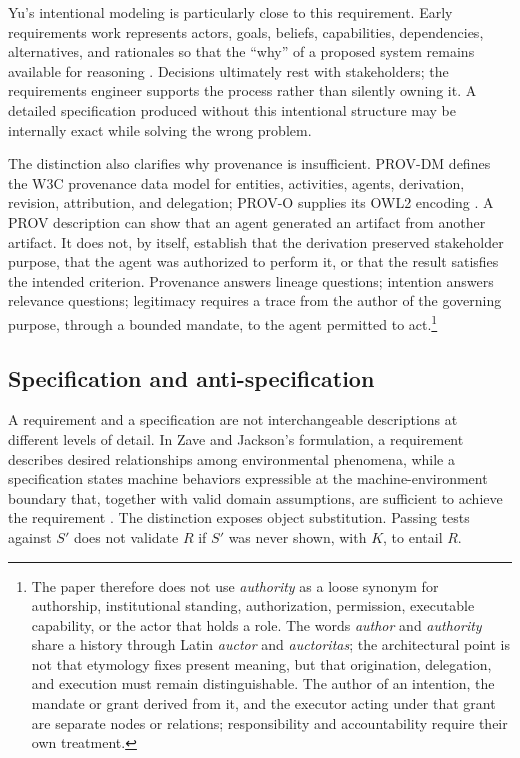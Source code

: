 \documentclass[10pt,a4paper]{article}
\begin{document}
Yu's intentional modeling is particularly close to this requirement. Early requirements work represents actors, goals, beliefs, capabilities, dependencies, alternatives, and rationales so that the ``why'' of a proposed system remains available for reasoning \cite{yu1997}. Decisions ultimately rest with stakeholders; the requirements engineer supports the process rather than silently owning it. A detailed specification produced without this intentional structure may be internally exact while solving the wrong problem.

The distinction also clarifies why provenance is insufficient. PROV-DM defines the W3C provenance data model for entities, activities, agents, derivation, revision, attribution, and delegation; PROV-O supplies its OWL2 encoding \cite{provdm2013,provo2013}. A PROV description can show that an agent generated an artifact from another artifact. It does not, by itself, establish that the derivation preserved stakeholder purpose, that the agent was authorized to perform it, or that the result satisfies the intended criterion. Provenance answers lineage questions; intention answers relevance questions; legitimacy requires a trace from the author of the governing purpose, through a bounded mandate, to the agent permitted to act.\footnote{The paper therefore does not use \emph{authority} as a loose synonym for authorship, institutional standing, authorization, permission, executable capability, or the actor that holds a role. The words \emph{author} and \emph{authority} share a history through Latin \emph{auctor} and \emph{auctoritas}; the architectural point is not that etymology fixes present meaning, but that origination, delegation, and execution must remain distinguishable. The author of an intention, the mandate or grant derived from it, and the executor acting under that grant are separate nodes or relations; responsibility and accountability require their own treatment.}

\subsection{Specification and anti-specification}

A requirement and a specification are not interchangeable descriptions at different levels of detail. In Zave and Jackson's formulation, a requirement describes desired relationships among environmental phenomena, while a specification states machine behaviors expressible at the machine-environment boundary that, together with valid domain assumptions, are sufficient to achieve the requirement \cite{zavejackson1997}. The distinction exposes object substitution. Passing tests against $S'$ does not validate $R$ if $S'$ was never shown, with $K$, to entail $R$.
\end{document}
